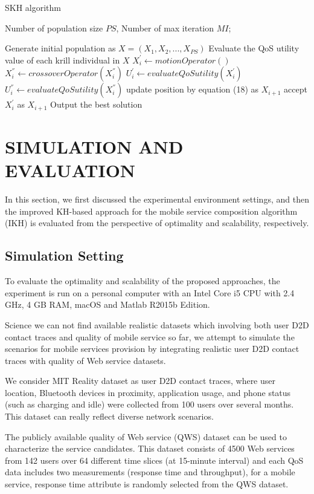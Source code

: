 \documentclass[10pt,journal,compsoc]{IEEEtran}
\begin{document}
\begin{algorithm}
\caption{SKH algorithm}
\label{alg2}
\begin{algorithmic}[1]

\REQUIRE Number of population size $PS$, Number of max iteration $MI$;

\STATE Generate initial population as $X = (X_1, X_2, ..., X_{PS})$
\STATE Evaluate the QoS utility value of each krill individual in $X$
		\STATE $X_i^{'} \leftarrow motionOperator()$
		\STATE $X_i^{''} \leftarrow crossoverOperator(X_i^{''})$
		\STATE $U_i^{'} \leftarrow evaluateQoSutility(X_i^{'})$
		\STATE $U_i^{''} \leftarrow evaluateQoSutility(X_i^{''})$
			\STATE update position by equation (18) as $X_{i+1}$
		\ELSE
			\STATE accept $X_i^{'}$ as $X_{i+1}$
		\ENDIF
	\ENDFOR
\ENDFOR
\STATE Output the best solution
\end{algorithmic}
\end{algorithm}

\section{SIMULATION AND EVALUATION}
In this section, we first discussed the experimental environment settings, and then the improved KH-based approach for the mobile service composition algorithm (IKH) is evaluated from the perspective of optimality and scalability, respectively.
\subsection{Simulation Setting}
To evaluate the optimality and scalability of the proposed approaches, the experiment is run on a personal computer with an Intel Core i5 CPU with 2.4 GHz, 4 GB RAM, macOS and Matlab R2015b Edition.

Science we can not find available realistic datasets which involving both user D2D contact traces and quality of mobile service so far, we attempt to simulate the scenarios for mobile services provision by integrating realistic user D2D contact traces with quality of Web service datasets. 

We consider MIT Reality dataset as user D2D contact traces, where user location, Bluetooth devices in proximity, application usage, and phone status (such as charging and idle) were collected from 100 users over several months. This dataset can really reflect diverse network scenarios.

The publicly available quality of Web service (QWS) dataset\cite{zheng2014investigating} can be used to characterize the service candidates. This dataset consists of 4500 Web services from 142 users over 64 different time slices (at 15-minute interval) and each QoS data includes two measurements (response time and throughput), for a mobile service, response time attribute is randomly selected from the QWS dataset. 
\end{document}
